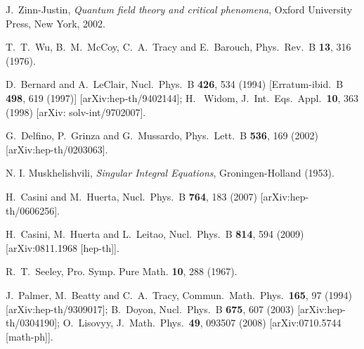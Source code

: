 \documentclass[11pt]{article}
\begin{document}
\begin{thebibliography}{99}
 J.~Zinn-Justin, {\sl Quantum field theory and critical phenomena}, Oxford University Press, 
 New York, 2002.


T.~T.~Wu, B.~M.~McCoy, C.~A.~Tracy and E.~Barouch,
 Phys.\ Rev.\ B {\bf 13}, 316 (1976).

 D.~Bernard and A.~LeClair,
 Nucl.\ Phys.\ B {\bf 426}, 534 (1994)
 [Erratum-ibid.\ B {\bf 498}, 619 (1997)]
 [arXiv:hep-th/9402144];
 H.~ Widom, J.\ Int.\ Eqs.\ Appl.\ {\bf 10}, 363 (1998) 
 [arXiv: solv-int/9702007].

  G.~Delfino, P.~Grinza and G.~Mussardo,
  Phys.\ Lett.\ B {\bf 536}, 169 (2002)
  [arXiv:hep-th/0203063].

N. I. Muskhelishvili, {\sl Singular Integral Equations}, Groningen-Holland (1953).



  H.~Casini and M.~Huerta,
  Nucl.\ Phys.\  B {\bf 764}, 183 (2007)
  [arXiv:hep-th/0606256].



  H.~Casini, M.~Huerta and L.~Leitao,
  Nucl.\ Phys.\  B {\bf 814}, 594 (2009)
  [arXiv:0811.1968 [hep-th]].






R.~T.~Seeley, Pro. Symp. Pure Math.  {\bf 10}, 288 (1967).

  J.~Palmer, M.~Beatty and C.~A.~Tracy,
  Commun.\ Math.\ Phys.\  {\bf 165}, 97 (1994)
  [arXiv:hep-th/9309017];
  B.~Doyon,
  Nucl.\ Phys.\ B {\bf 675}, 607 (2003)
  [arXiv:hep-th/0304190];
   O.~Lisovyy,
  J.\ Math.\ Phys.\  {\bf 49}, 093507 (2008)
  [arXiv:0710.5744 [math-ph]].





\end{thebibliography}
\end{document}
